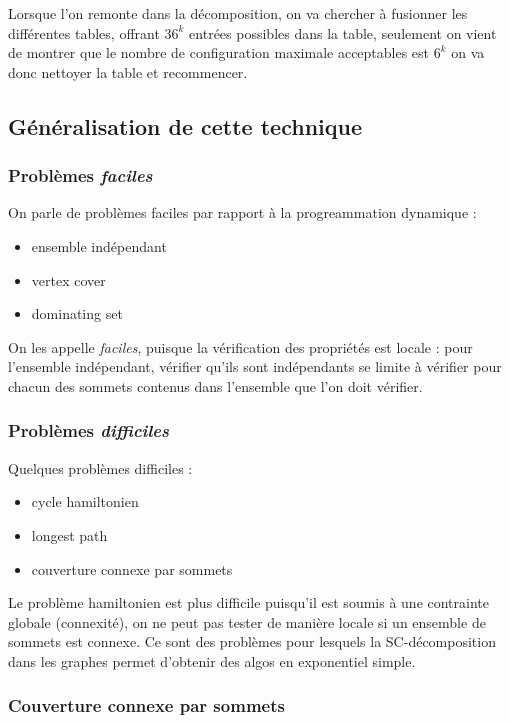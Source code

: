 \documentclass[a4paper, 11pt]{thesis}
\begin{document}
Lorsque l'on remonte dans la décomposition, on va chercher à fusionner les différentes tables,
offrant $36^k$ entrées possibles dans la table, seulement on vient de montrer que le nombre de
configuration maximale acceptables est $6^k$ on va donc nettoyer la table et recommencer.


\subsection{Généralisation de cette technique}

\subsubsection{Problèmes \emph{faciles}}

On parle de problèmes faciles par rapport à la progreammation dynamique : 
\begin{itemize}
    \item ensemble indépendant
    \item vertex cover
    \item dominating set
\end{itemize}

On les appelle \emph{faciles}, puisque la vérification des propriétés est locale :
pour l'ensemble indépendant, vérifier qu'ils sont indépendants se limite à vérifier pour chacun des
sommets contenus dans l'ensemble que l'on doit vérifier.

\subsubsection{Problèmes \emph{difficiles}}

Quelques problèmes difficiles :
\begin{itemize}
    \item cycle hamiltonien
    \item longest path
    \item couverture connexe par sommets
\end{itemize}

Le problème hamiltonien est plus difficile puisqu'il est soumis à une contrainte globale
(connexité), on ne peut pas tester de manière locale si un ensemble de sommets est connexe. Ce sont
des problèmes pour lesquels la SC-décomposition dans les graphes permet d'obtenir des algos en
exponentiel simple.

\subsubsection{Couverture connexe par sommets}
\end{document}
